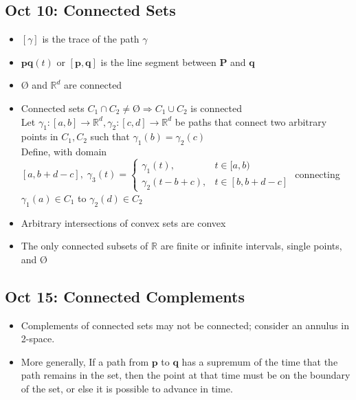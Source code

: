 \documentclass[10pt, oneside]{article}
\newcommand{\R}{\mathbb{R}}
\let \foo \O
\renewcommand{\O}{\text{\foo}}
\renewcommand{\vec}[1]{\mathbf{#1}}
\begin{document}
\subsection{Oct 10: Connected Sets}
\begin{itemize}
    \item $[\gamma]$ is the trace of the path $\gamma$
    \item $\vec{p}\vec{q}(t)$ or $[\vec{p},\vec{q}]$ is the line segment between $\vec{P}$ and $\vec{q}$
    \item $\O$ and $\R^d$ are connected
    \item Connected sets $C_1 \cap C_2 \neq \O \Rightarrow C_1 \cup C_2$ is connected\\
        Let $\gamma_1 : [a,b] \rightarrow \R^d, \gamma_2 : [c,d] \rightarrow \R^d$ be paths that connect two arbitrary points in $C_1, C_2$ such that $\gamma_1(b) = \gamma_2(c)$\\
        Define, with domain $[a,b+d-c], \; \displaystyle \gamma_3(t) = 
            \begin{cases}
            \gamma_1(t), & t \in [a,b)\\
            \gamma_2(t-b+c), & t \in [b,b+d-c]
            \end{cases}$
        connecting $\gamma_1(a) \in C_1$ to $\gamma_2(d) \in C_2$
    \item Arbitrary intersections of convex sets are convex
    \item The only connected subsets of $\R$ are finite or infinite intervals, single points, and $\O$
\end{itemize}

\subsection{Oct 15: Connected Complements}
\begin{itemize}
    \item Complements of connected sets may not be connected; consider an annulus in 2-space.
    \item More generally, If a path from $\vec{p}$ to $\vec{q}$ has a supremum of the time that the path remains in the set, then the point at that time must be on the boundary of the set, or else it is possible to advance in time.
\end{itemize}
\end{document}
